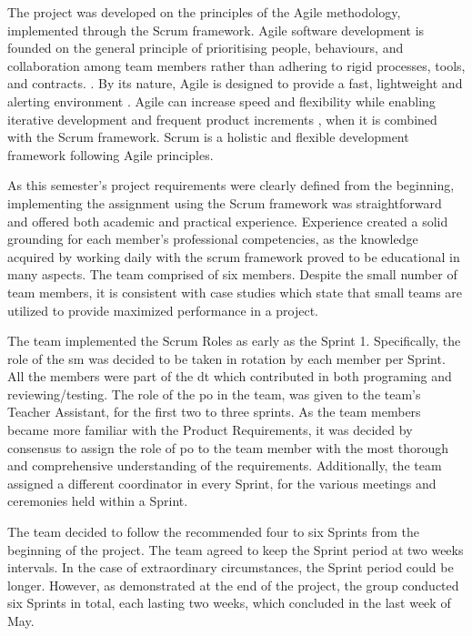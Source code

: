 
The project was developed on the principles of the Agile methodology, implemented through the Scrum framework. 
Agile software development is founded on the general principle of prioritising people, behaviours, and collaboration among team members rather than adhering to rigid processes, tools, and contracts. \cite{Adi2015}. 
By its nature, Agile is designed to provide a fast, lightweight and alerting environment \cite{Adi2015}. Agile can increase speed and flexibility while enabling iterative development and frequent product increments \cite{Adi2015}, when it is combined with the Scrum framework. Scrum is a holistic and flexible development framework following Agile principles.

As this semester’s project requirements were clearly defined from the beginning, implementing the assignment using the Scrum framework was straightforward and offered both academic and practical experience. 
Experience created a solid grounding for each member’s professional competencies, as the knowledge acquired by working daily with the scrum framework proved to be educational in many aspects. The team comprised of six members. Despite the small number of team members, it is consistent with case studies which state that small teams are utilized to provide maximized performance \cite{Hoegl2005} in a project. 

The team implemented the Scrum Roles as early as the Sprint 1. 
Specifically, the role of the \acrfull{sm} was decided to be taken in rotation by each member per Sprint. 
All the members were part of the \acrfull{dt} which contributed in both programing and reviewing/testing. The role of the \acrfull{po} in the team, was given to the team’s Teacher Assistant, for the first two to three sprints. As the team members became more familiar with the Product Requirements, it was decided by consensus to assign the role of \acrshort{po} to the team member with the most thorough and comprehensive understanding of the requirements. Additionally, the team assigned a different coordinator in every Sprint, for the various meetings and ceremonies held within a Sprint.

The team decided to follow the recommended four to six Sprints \cite{Hron2022} from the beginning of the project. The team agreed to keep the Sprint period at two weeks intervals. In the case of extraordinary circumstances, the Sprint period could be longer. However, as demonstrated at the end of the project, the group conducted six Sprints in total, each lasting two weeks, which concluded in the last week of May.

